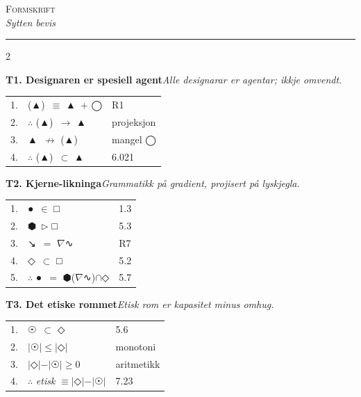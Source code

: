 \documentclass[a4paper,10pt]{article}
\makeatletter
\newcommand{\g}[1]{{\symbolfont #1}}
\newcommand{\gAgent}{\g{▲}}
\newcommand{\gDesignar}{\g{(▲)}}
\newcommand{\gForm}{\g{●}}
\newcommand{\gGrammatikk}{\g{⬢}}
\newcommand{\gFormrom}{\g{□}}
\newcommand{\gLyskjegle}{\g{◇}}
\newcommand{\gOmhug}{\g{☉}}
\newcommand{\gTrykk}{\g{↘}}
\newcommand{\gLandskap}{\g{∿}}
\newcommand{\gSirkel}{\g{◯}}
\newcommand{\bv}[3]{%
\vspace{0.4em}%
\noindent\textbf{#1}\hspace{0.4em}\emph{\footnotesize #2}\\[0.15em]
\begin{tabular}{@{}r@{\hspace{0.3em}}l@{\hspace{0.8em}}l@{}}
#3
\end{tabular}%
}
\makeatother
\begin{document}
\begin{center}
{\huge\scshape Formskrift}\\[0.2em]
{\itshape Sytten bevis}
\end{center}

\vspace{0.3em}
\begin{center}\rule{\textwidth}{0.4pt}\end{center}
\vspace{0.4em}

\footnotesize
\renewcommand{\arraystretch}{1.2}

\begin{multicols}{2}

\bv{T1. Designaren er spesiell agent}{Alle designarar er agentar; ikkje omvendt.}{%
1. & \gDesignar\ $\equiv$ \gAgent\ $+$ \gSirkel                                & R1\\
2. & $\therefore$ \gDesignar\ $\rightarrow$ \gAgent                            & projeksjon\\
3. & \gAgent\ $\not\rightarrow$ \gDesignar                                     & mangel \gSirkel\\
4. & $\therefore$ \gDesignar\ $\subset$ \gAgent                                & 6.021\\
}

\bv{T2. Kjerne-likninga}{Grammatikk p\aa{} gradient, projisert p\aa{} lyskjegla.}{%
1. & \gForm\ $\in$ \gFormrom                                                   & 1.3\\
2. & \gGrammatikk\ $\triangleright$ \gFormrom                                   & 5.3\\
3. & \gTrykk\ $=$ $\nabla$\gLandskap                                           & R7\\
4. & \gLyskjegle\ $\subset$ \gFormrom                                          & 5.2\\
5. & $\therefore$ \gForm\ $=$ \gGrammatikk($\nabla$\gLandskap)$\cap$\gLyskjegle & 5.7\\
}

\bv{T3. Det etiske rommet}{Etisk rom er kapasitet minus omhug.}{%
1. & \gOmhug\ $\subset$ \gLyskjegle                                            & 5.6\\
2. & $|$\gOmhug$|\leq|$\gLyskjegle$|$                                          & monotoni\\
3. & $|$\gLyskjegle$|-|$\gOmhug$|\geq 0$                                       & aritmetikk\\
4. & $\therefore$ \emph{etisk} $\equiv|$\gLyskjegle$|-|$\gOmhug$|$              & 7.23\\
}


\end{multicols}
\end{document}
